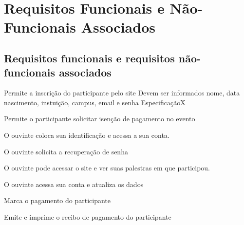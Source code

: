 \documentclass[12pt,a4paper]{article}
\begin{document}
        \section{Requisitos Funcionais e Não-Funcionais Associados}
        
        	\subsection{Requisitos funcionais e requisitos não-funcionais associados}
        

		\setcounter{NumberReqF}{0}
		\setcounter{NumberReqNF}{0}
        	
        	{Permite a inscrição do participante pelo site}
        	{%
        	  {Devem ser informados nome, data nascimento, instuição, campus, email e senha}
        	  {Especificação}{X}{}%
        	}
        	
        	{Permite o participante solicitar isenção de pagamento no evento}
        	{%
        	}
        	
        	
        	
        	{O ouvinte coloca sua identificação e acessa a sua conta.}
        	{%
        	
        	}
			
									
        	{O ouvinte solicita a recuperação de senha}
        	{%
        	
        	}
			
        	{O ouvinte pode acessar o site e ver suas palestras em que participou.}
        	{%
        	
        	}
			
        	{O ouvinte acessa sua conta e atualiza os dados}
        	{%
        	
        	}
			
        	{Marca o pagamento do participante}
        	{%
        	
        	}
			
        	{Emite e imprime o recibo de pagamento do participante}
        	{%
        	
        	}
			
\end{document}
